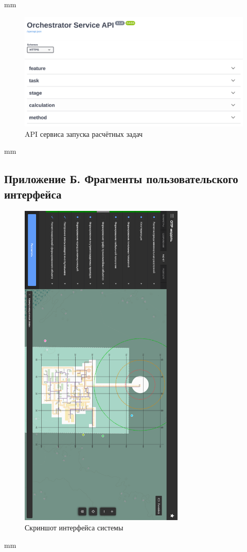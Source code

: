  mm
\begin{figure}[H]
	\includegraphics[width=\textwidth]{applications/pictures/orchestrator_swagger}
	\caption{API сервиса запуска расчётных задач}
	\label{pic:application__orchestrator-swagger}
\end{figure}
 mm


\subsection*{\large{Приложение Б. Фрагменты пользовательского интерфейса}}

\begin{figure}[H]
	\includegraphics[width=0.7\textwidth]{applications/pictures/system}
	\caption{Скриншот интерфейса системы}
	\label{pic:application__system}
\end{figure}
 mm